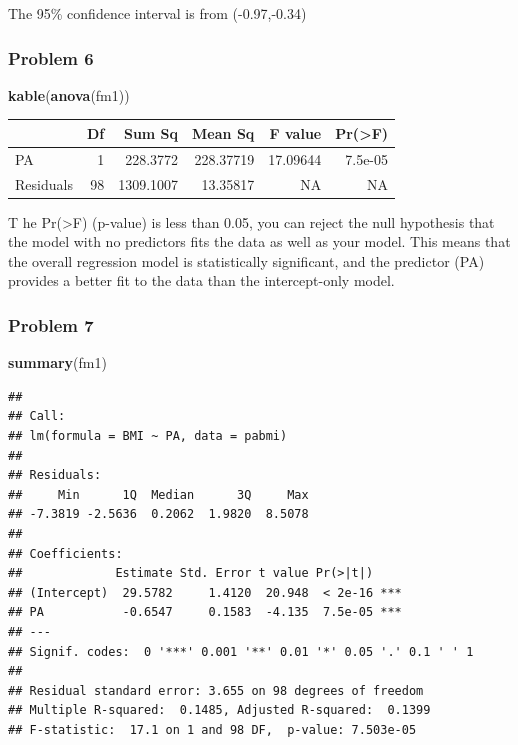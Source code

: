 \documentclass[
]{article}
\newenvironment{Shaded}{\begin{snugshade}}{\end{snugshade}}
\newcommand{\FunctionTok}[1]{\textcolor[rgb]{0.13,0.29,0.53}{\textbf{#1}}}
\newcommand{\NormalTok}[1]{#1}
\begin{document}
The 95\% confidence interval is from (-0.97,-0.34)

\hypertarget{problem-6}{%
\subsubsection{Problem 6}\label{problem-6}}

\begin{Shaded}
\begin{Highlighting}[]
\FunctionTok{kable}\NormalTok{(}\FunctionTok{anova}\NormalTok{(fm1))}
\end{Highlighting}
\end{Shaded}

\begin{longtable}[]{@{}lrrrrr@{}}
\toprule\noalign{}
& Df & Sum Sq & Mean Sq & F value & Pr(\textgreater F) \\
\midrule\noalign{}
\endhead
\bottomrule\noalign{}
\endlastfoot
PA & 1 & 228.3772 & 228.37719 & 17.09644 & 7.5e-05 \\
Residuals & 98 & 1309.1007 & 13.35817 & NA & NA \\
\end{longtable}

T he Pr(\textgreater F) (p-value) is less than 0.05, you can reject the
null hypothesis that the model with no predictors fits the data as well
as your model. This means that the overall regression model is
statistically significant, and the predictor (PA) provides a better fit
to the data than the intercept-only model.

\hypertarget{problem-7}{%
\subsubsection{Problem 7}\label{problem-7}}

\begin{Shaded}
\begin{Highlighting}[]
\FunctionTok{summary}\NormalTok{(fm1)}
\end{Highlighting}
\end{Shaded}

\begin{verbatim}
## 
## Call:
## lm(formula = BMI ~ PA, data = pabmi)
## 
## Residuals:
##     Min      1Q  Median      3Q     Max 
## -7.3819 -2.5636  0.2062  1.9820  8.5078 
## 
## Coefficients:
##             Estimate Std. Error t value Pr(>|t|)    
## (Intercept)  29.5782     1.4120  20.948  < 2e-16 ***
## PA           -0.6547     0.1583  -4.135  7.5e-05 ***
## ---
## Signif. codes:  0 '***' 0.001 '**' 0.01 '*' 0.05 '.' 0.1 ' ' 1
## 
## Residual standard error: 3.655 on 98 degrees of freedom
## Multiple R-squared:  0.1485, Adjusted R-squared:  0.1399 
## F-statistic:  17.1 on 1 and 98 DF,  p-value: 7.503e-05
\end{verbatim}
\end{document}
